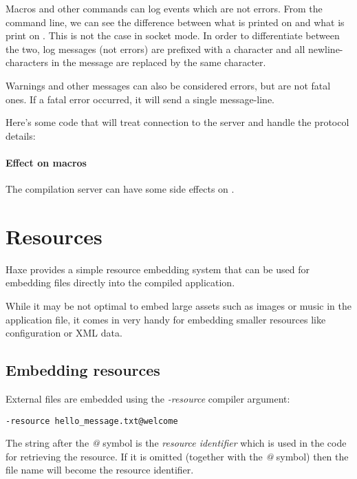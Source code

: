 Macros and other commands can log events which are not errors. From the command line, we can see the difference between what is printed on  and what is print on . This is not the case in socket mode. In order to differentiate between the two, log messages (not errors) are prefixed with a  character and all newline-characters in the message are replaced by the same  character.

Warnings and other messages can also be considered errors, but are not fatal ones. If a fatal error occurred, it will send a single  message-line.

Here's some code that will treat connection to the server and handle the protocol details:


\paragraph{Effect on macros}
The compilation server can have some side effects on .



\section{Resources}
\label{cr-resources}

Haxe provides a simple resource embedding system that can be used for embedding files directly into the compiled application.

While it may be not optimal to embed large assets such as images or music in the application file, it comes in very handy for embedding smaller resources like configuration or XML data.

\subsection{Embedding resources}
\label{cr-resources-embed}

External files are embedded using the \emph{-resource} compiler argument:

\begin{lstlisting}
-resource hello_message.txt@welcome
\end{lstlisting}

The string after the \emph{@} symbol is the \emph{resource identifier} which is used in the code for retrieving the resource. If it is omitted (together with the \emph{@} symbol) then the file name will become the resource identifier.

